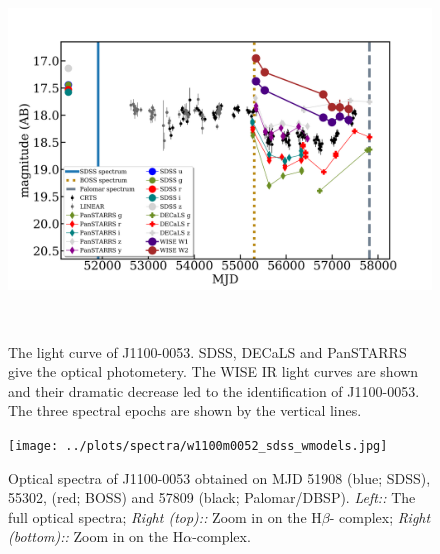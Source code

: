 \documentclass{nature}
\begin{document}
\begin{figure}
  \centering
  \includegraphics[width=16.00cm, height=10.00cm, trim=0.0cm 0.0cm 0.0cm 0.0cm, clip]
  {../plots/lc/J110057_lc_20171204v1.png}
  \caption[]{The light curve of J1100-0053. SDSS, DECaLS and PanSTARRS
    give the optical photometery. The WISE IR light curves are shown and
    their dramatic decrease led to the identification of J1100-0053. The
    three spectral epochs are shown by the vertical lines.}
  \label{fig:J110057_LC_CRTS}
\end{figure}


\begin{figure}
  \centering
  \texttt{[image: ../plots/spectra/w1100m0052\_sdss\_wmodels.jpg]}
  \caption[]{
Optical spectra of J1100-0053 obtained on MJD 51908 (blue; SDSS), 55302,
(red; BOSS) and 57809 (black; Palomar/DBSP).  {\it Left::} The full
optical spectra; {\it Right (top)::} Zoom in on the H$\beta$-\oiii
complex; {\it Right (bottom)::} Zoom in on the H$\alpha$-\nii complex.
}
  \label{fig:J110057_spectra}
\end{figure}
\end{document}

